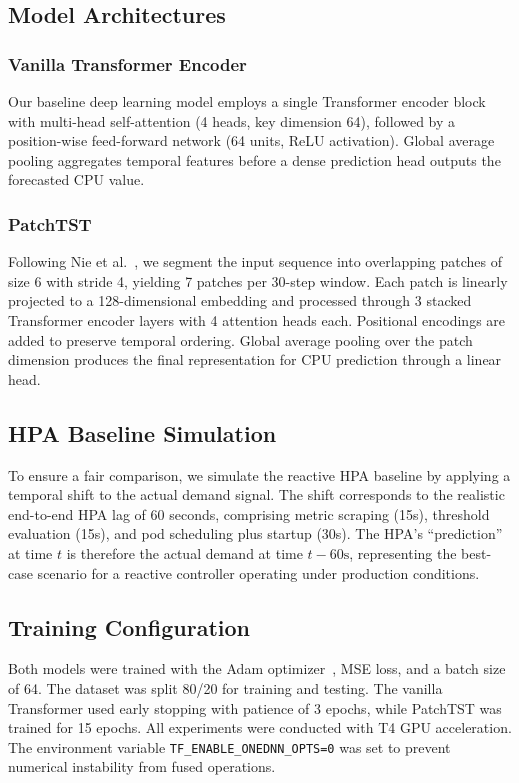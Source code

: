 \documentclass[conference]{IEEEtran}
\begin{document}
\subsection{Model Architectures}

\subsubsection{Vanilla Transformer Encoder}
Our baseline deep learning model employs a single Transformer encoder block with multi-head self-attention (4 heads, key dimension 64), followed by a position-wise feed-forward network (64 units, ReLU activation). Global average pooling aggregates temporal features before a dense prediction head outputs the forecasted CPU value.

\subsubsection{PatchTST}
Following Nie et al.~\cite{nie2023patchtst}, we segment the input sequence into overlapping patches of size 6 with stride 4, yielding 7 patches per 30-step window. Each patch is linearly projected to a 128-dimensional embedding and processed through 3 stacked Transformer encoder layers with 4 attention heads each. Positional encodings are added to preserve temporal ordering. Global average pooling over the patch dimension produces the final representation for CPU prediction through a linear head.

\subsection{HPA Baseline Simulation}
To ensure a fair comparison, we simulate the reactive HPA baseline by applying a temporal shift to the actual demand signal. The shift corresponds to the realistic end-to-end HPA lag of 60 seconds, comprising metric scraping (15s), threshold evaluation (15s), and pod scheduling plus startup (30s). The HPA's ``prediction'' at time $t$ is therefore the actual demand at time $t - 60\text{s}$, representing the best-case scenario for a reactive controller operating under production conditions.

\subsection{Training Configuration}
Both models were trained with the Adam optimizer~\cite{kingma2015adam}, MSE loss, and a batch size of 64. The dataset was split 80/20 for training and testing. The vanilla Transformer used early stopping with patience of 3 epochs, while PatchTST was trained for 15 epochs. All experiments were conducted with T4 GPU acceleration. The environment variable \texttt{TF\_ENABLE\_ONEDNN\_OPTS=0} was set to prevent numerical instability from fused operations.
\end{document}
